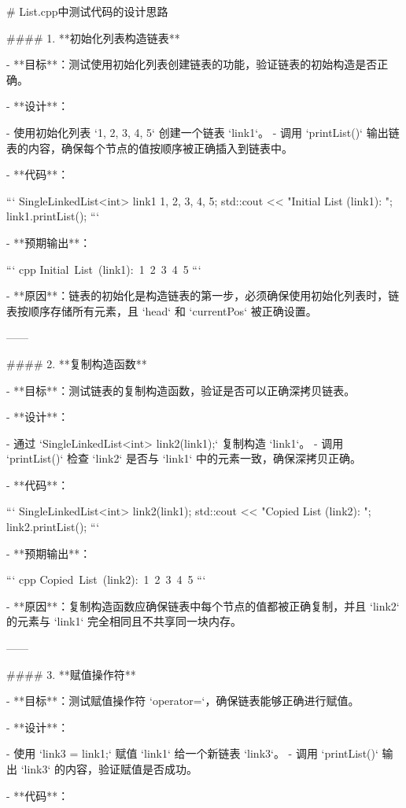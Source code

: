 #                            List.cpp中测试代码的设计思路

#### 1. **初始化列表构造链表**

- **目标**：测试使用初始化列表创建链表的功能，验证链表的初始构造是否正确。

- **设计**：

  - 使用初始化列表 `{1, 2, 3, 4, 5}` 创建一个链表 `link1`。
  - 调用 `printList()` 输出链表的内容，确保每个节点的值按顺序被正确插入到链表中。

- **代码**：

  ```
  SingleLinkedList<int> link1 {1, 2, 3, 4, 5};
  std::cout << "Initial List (link1): ";
  link1.printList();
  ```

- **预期输出**：

  ``` cpp
  Initial List (link1): 1 2 3 4 5
  ```

  

- **原因**：链表的初始化是构造链表的第一步，必须确保使用初始化列表时，链表按顺序存储所有元素，且 `head` 和 `currentPos` 被正确设置。

------

#### 2. **复制构造函数**

- **目标**：测试链表的复制构造函数，验证是否可以正确深拷贝链表。

- **设计**：

  - 通过 `SingleLinkedList<int> link2(link1);` 复制构造 `link1`。
  - 调用 `printList()` 检查 `link2` 是否与 `link1` 中的元素一致，确保深拷贝正确。

- **代码**：

  ```
  SingleLinkedList<int> link2(link1);
  std::cout << "Copied List (link2): ";
  link2.printList();
  ```

- **预期输出**：

  ``` cpp
  Copied List (link2): 1 2 3 4 5
  ```

  

- **原因**：复制构造函数应确保链表中每个节点的值都被正确复制，并且 `link2` 的元素与 `link1` 完全相同且不共享同一块内存。

------

#### 3. **赋值操作符**

- **目标**：测试赋值操作符 `operator=`，确保链表能够正确进行赋值。

- **设计**：

  - 使用 `link3 = link1;` 赋值 `link1` 给一个新链表 `link3`。
  - 调用 `printList()` 输出 `link3` 的内容，验证赋值是否成功。

- **代码**：

